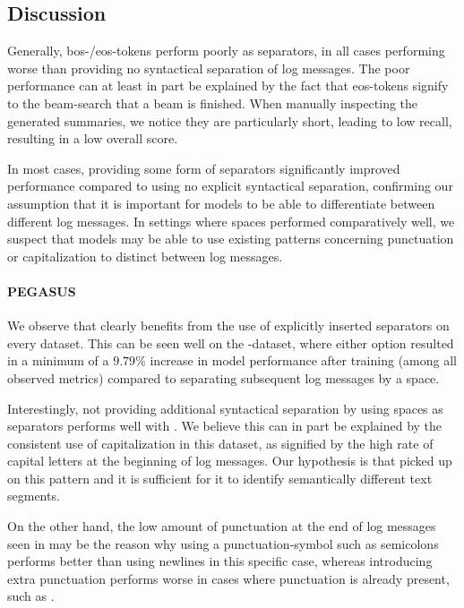 \subsection{Discussion}

Generally, \acs{bos}-/\acs{eos}-tokens perform poorly as separators,
in all cases performing worse than providing no syntactical separation of log messages.
The poor performance can at least in part be explained by the fact
that \acs{eos}-tokens signify to the beam-search that a beam is finished.
When manually inspecting the generated summaries, we notice they are particularly short,
leading to low recall, resulting in a low overall score.

In most cases, providing some form of separators significantly improved performance compared to using no explicit syntactical separation,
confirming our assumption that it is important for models to be able to differentiate between different log messages.
In settings where spaces performed comparatively well,
we suspect that models may be able to use existing patterns concerning punctuation or capitalization to distinct between log messages.

\paragraph{PEGASUS}

We observe that  clearly benefits from the use of explicitly inserted separators on every dataset.
This can be seen well on the \logsummary{}-dataset,
where either option resulted in a minimum of a \(9.79\%\) increase in model performance after training (among all observed metrics)
compared to separating subsequent log messages by a space.

Interestingly, not providing additional syntactical separation by using spaces as separators
performs well with \hadoop{}.
We believe this can in part be explained by the consistent use of capitalization in this dataset,
as signified by the high rate of capital letters at the beginning of log messages.
Our hypothesis is that  picked up on this pattern and it is sufficient for it to identify semantically different text segments.

On the other hand, the low amount of punctuation at the end of log messages seen in \hadoop{}
may be the reason why using a punctuation-symbol such as semicolons performs better than using newlines in this specific case,
whereas introducing extra punctuation performs worse in cases where punctuation is already present,
such as \telco{}.

